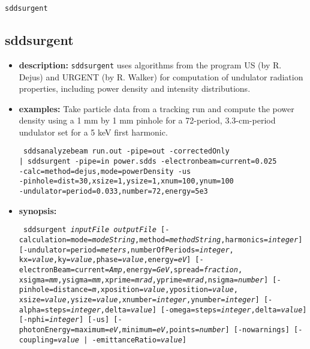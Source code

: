 \documentclass[11pt]{article}
\begin{document}
\newpage
\begin{latexonly}
\newpage
\begin{center}{\Large\verb|sddsurgent|}\end{center}
\end{latexonly}
\subsection{sddsurgent}

\begin{itemize}
\item {\bf description:} {\tt sddsurgent} uses algorithms from the program
US (by R. Dejus) and URGENT (by R. Walker) for computation of undulator
radiation properties, including power density and intensity distributions.

\item {\bf examples:}
Take particle data from a tracking run and compute the power density using a 1 mm by 1 mm pinhole
for a 72-period, 3.3-cm-period undulator set for a 5 keV first harmonic.
\begin{flushleft}{\tt
sddsanalyzebeam run.out -pipe=out -correctedOnly \\ 
 | sddsurgent -pipe=in power.sdds -electronbeam=current=0.025 \\
 -calc=method=dejus,mode=powerDensity -us \\
 -pinhole=dist=30,xsize=1,ysize=1,xnum=100,ynum=100 \\
 -undulator=period=0.033,number=72,energy=5e3
}\end{flushleft}

\item {\bf synopsis:}
\begin{flushleft}{\tt
sddsurgent {\em inputFile} {\em outputFile}
    [-calculation=mode={\em modeString},method={\em methodString},harmonics={\em integer}] 
    [-undulator=period={\em meters},numberOfPeriods={\em integer},
      kx={\em value},ky={\em value},phase={\em value},energy={\em eV}] 
    [-electronBeam=current={\em Amp},energy={\em GeV},spread={\em fraction},
      xsigma={\em mm},ysigma={\em mm},xprime={\em mrad},yprime={\em mrad},nsigma={\em number}] 
    [-pinhole=distance={\em m},xposition={\em value},yposition={\em value},
      xsize={\em value},ysize={\em value},xnumber={\em integer},ynumber={\em integer}]
    [-alpha=steps={\em integer},delta={\em value}] 
    [-omega=steps={\em integer},delta={\em value}] [-nphi={\em integer}] 
    [-us] [-photonEnergy=maximum={\em eV},minimum={\em eV},points={\em number}]
    [-nowarnings] [-coupling={\em value} | -emittanceRatio={\em value}] 
}\end{flushleft}


\end{itemize}
\end{document}
